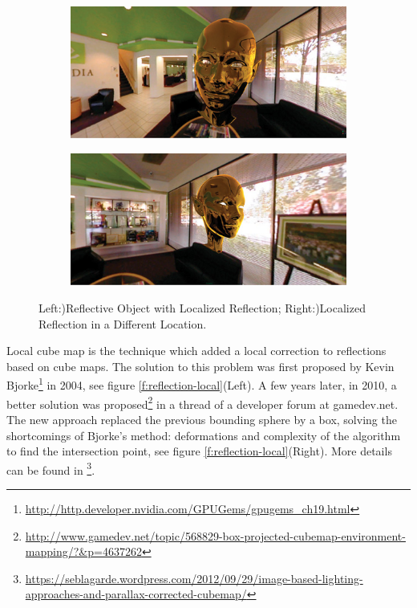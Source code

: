 \begin{figure}\label{f:reflection-error}
	\begin{subfigure}[b]{0.5\textwidth}
		\includegraphics[width=1.0\textwidth]{graphics/gi/path-32-1}
	\end{subfigure}
	\begin{subfigure}[b]{0.5\textwidth}
		\includegraphics[width=1.0\textwidth]{graphics/gi/path-32-2}
	\end{subfigure}
	\caption{Left:)Reflective Object with Localized Reflection; Right:)Localized Reflection in a Different Location.}
\end{figure}

Local cube map is the technique which added a local correction to reflections based on cube maps. The solution to this problem was first proposed by Kevin Bjorke\footnote{\url{http://http.developer.nvidia.com/GPUGems/gpugems_ch19.html}} in 2004, see figure \ref{f:reflection-local}(Left). A few years later, in 2010, a better solution was proposed\footnote{\url{http://www.gamedev.net/topic/568829-box-projected-cubemap-environment-mapping/?&p=4637262}} in a thread of a developer forum at gamedev.net. The new approach replaced the previous bounding sphere by a box, solving the shortcomings of Bjorke's method: deformations and complexity of the algorithm to find the intersection point, see figure \ref{f:reflection-local}(Right). More details can be found in \footnote{\url{https://seblagarde.wordpress.com/2012/09/29/image-based-lighting-approaches-and-parallax-corrected-cubemap/}}.

